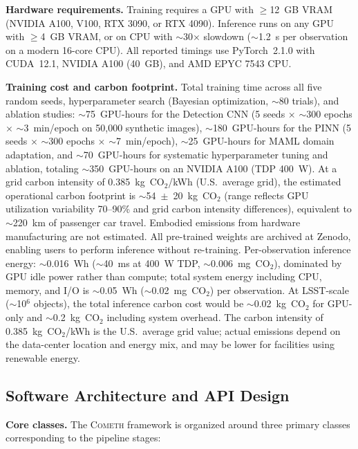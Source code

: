 \documentclass[usenatbib]{mnras}
\begin{document}
\textbf{Hardware requirements.} Training requires a GPU with $\geq$12~GB VRAM (NVIDIA A100, V100, RTX 3090, or RTX 4090). Inference runs on any GPU with $\geq$4~GB VRAM, or on CPU with $\sim$30$\times$ slowdown ($\sim$1.2~s per observation on a modern 16-core CPU). All reported timings use PyTorch~2.1.0 with CUDA~12.1, NVIDIA A100 (40~GB), and AMD EPYC 7543 CPU.

\textbf{Training cost and carbon footprint.} Total training time across all five random seeds, hyperparameter search (Bayesian optimization, $\sim$80 trials), and ablation studies: $\sim$75~GPU-hours for the Detection CNN (5 seeds $\times$ $\sim$300 epochs $\times$ $\sim$3~min/epoch on 50,000 synthetic images), $\sim$180~GPU-hours for the PINN (5 seeds $\times$ $\sim$300 epochs $\times$ $\sim$7~min/epoch), $\sim$25~GPU-hours for MAML domain adaptation, and $\sim$70~GPU-hours for systematic hyperparameter tuning and ablation, totaling $\sim$350~GPU-hours on an NVIDIA A100 (TDP 400~W). At a grid carbon intensity of 0.385~kg~CO$_2$/kWh (U.S.\ average grid), the estimated operational carbon footprint is $\sim$54~$\pm$~20~kg~CO$_2$ (range reflects GPU utilization variability 70--90\% and grid carbon intensity differences), equivalent to $\sim$220~km of passenger car travel. Embodied emissions from hardware manufacturing are not estimated. All pre-trained weights are archived at Zenodo, enabling users to perform inference without re-training. Per-observation inference energy: $\sim$0.016~Wh ($\sim$40~ms at 400~W TDP, $\sim$0.006~mg~CO$_2$), dominated by GPU idle power rather than compute; total system energy including CPU, memory, and I/O is $\sim$0.05~Wh ($\sim$0.02~mg~CO$_2$) per observation. At LSST-scale ($\sim$10$^6$ objects), the total inference carbon cost would be $\sim$0.02~kg~CO$_2$ for GPU-only and $\sim$0.2~kg~CO$_2$ including system overhead. The carbon intensity of 0.385~kg~CO$_2$/kWh is the U.S.\ average grid value; actual emissions depend on the data-center location and energy mix, and may be lower for facilities using renewable energy.

\subsection{Software Architecture and API Design}\label{sec:api}

\textbf{Core classes.} The \textsc{Cometh} framework is organized around three primary classes corresponding to the pipeline stages:
\end{document}
